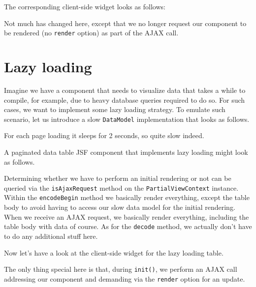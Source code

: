 The corresponding client-side widget looks as follows:

Not much has changed here, except that we no longer request our component to be rendered (no \texttt{render} option) as part of the AJAX call.

\section{Lazy loading}
Imagine we have a component that needs to visualize data that takes a while to compile, for example, due to heavy database queries required to do so.
For such cases, we want to implement some lazy loading strategy.
To emulate such scenario, let us introduce a slow \texttt{DataModel} implementation that looks as follows.

For each page loading it sleeps for 2 seconds, so quite slow indeed.

A paginated data table JSF component that implements lazy loading might look as follows.

Determining whether we have to perform an initial rendering or not can be queried via the \texttt{isAjaxRequest} method on the \texttt{PartialViewContext} instance.
Within the \texttt{encodeBegin} method we basically render everything, except the table body to avoid having to access our slow data model for the initial rendering.
When we receive an AJAX request, we basically render everything, including the table body with data of course.
As for the \texttt{decode} method, we actually don't have to do any additional stuff here.

Now let's have a look at the client-side widget for the lazy loading table.

The only thing special here is that, during \texttt{init()}, we perform an AJAX call addressing our component and demanding via the \texttt{render} option for an update.

